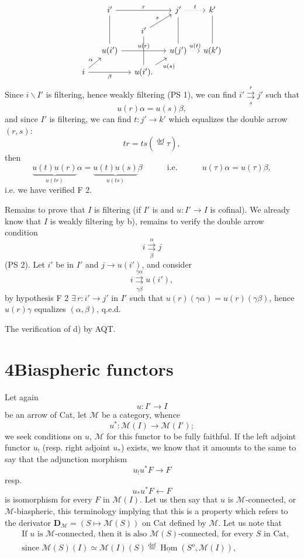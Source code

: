 \documentclass[11pt]{article}
\newcommand{\printedpage}[1]{\marginpar{\footnotesize p.~#1}}
\newcommand{\msp}[1]{\marginpar{\footnotesize [#1]}}
\newcommand{\uHom}{\underline{\operatorname{Hom}}}
\newcommand{\bs}{\backslash}
\newcommand{\cM}{\mathcal{M}}
\newcommand{\dbl}[2]{\mathrel{\overset{#1}{\underset{#2}{\rightrightarrows}}}}
\newcommand{\defeq}{\overset{\text{def}}{=}}
\begin{document}
\printedpage{31}
\msp{page 48}
\[
\begin{tikzcd}[row sep=small, column sep=small]
& i' \arrow[rr, "r"] \arrow[dd, dash] & & j' \arrow[r, dotted, "t"] \arrow[dd, dash] & k' \arrow[dd, dash] \\
& & i' \arrow[ur, "s"] \arrow[dd, dash] & & \\
& u(i') \arrow[rr, "u(r)"] & & u(j') \arrow[r, dotted, "u(t)"] & u(k') \\
i \arrow[ur, "\alpha"] \arrow[rr, "\beta"'] & & u(i'). \arrow[ur, "u(s)"'] & &
\end{tikzcd}
\]
Since $i\bs I'$ is filtering, hence weakly filtering (PS 1), we can find $i' \dbl{r}{s} j'$ such that
\[
u(r)\alpha = u(s)\beta,
\]
and since $I'$ is filtering, we can find $t : j' \longrightarrow k'$ which equalizes the double arrow $(r, s)$:
\[
tr = ts(\defeq \tau),
\]
then
\[
\underbrace{u(t)u(r)}_{u(tr)}\alpha = \underbrace{u(t)u(s)}_{u(ts)}\beta \qquad\quad \text{i.e.} \qquad\quad u(\tau)\alpha = u(\tau)\beta,
\]
i.e. we have verified F 2.

Remains to prove that $I$ is filtering (if $I'$ is and $u : I' \longrightarrow I$ is cofinal). We already know that $I$ is weakly filtering by b), remains to verify the double arrow condition
\[
i \dbl{\alpha}{\beta} j
\]
(PS 2). Let $i'$ be in $I'$ and $j \longrightarrow u(i')$, and consider
\[
i \dbl{\gamma\alpha}{\gamma\beta} u(i'),
\]
by hypothesis F 2 $\exists\, r : i' \longrightarrow j'$ in $I'$ such that
\msp{page 49}
$u(r)(\gamma\alpha) = u(r)(\gamma\beta)$, hence $u(r)\gamma$ equalizes $(\alpha, \beta)$, q.e.d.

The verification of d) by AQT.

\printedpage{32}
\section*{4\quad Biaspheric functors}

Let again
\[
u : I' \longrightarrow I
\]
be an arrow of Cat, let $\cM$ be a category, whence
\[
u^* : \cM(I) \longrightarrow \cM(I');
\tag*{(4.1)}
\]
we seek conditions on $u$, $\cM$ for this functor to be fully faithful. If the left adjoint functor $u_!$ (resp. right adjoint $u_*$) exists, we know that it amounts to the same to say that the adjunction morphism
\[
u_!u^*F \longrightarrow F
\tag*{(4.2)}
\]
resp.
\[
u_*u^*F \longleftarrow F
\tag*{(4.2 bis)}
\]
is isomorphism for every $F$ in $\cM(I)$. Let us then say that $u$ is $\cM$-connected, or $\cM$-biaspheric, this terminology implying that this is a property which refers to the derivator $\mathbf{D}_{\cM} = (S \longmapsto \cM(S))$ on Cat defined by $\cM$. Let us note that
\[
\begin{aligned}
&\text{If $u$ is $\cM$-connected, then it is also $\cM(S)$-connected, for every $S$ in Cat,}\\
&\text{since $\cM(S)(I) \simeq \cM(I)(S) \defeq \uHom(S^o, \cM(I))$,}
\end{aligned}
\tag*{(4.3)}
\]
\end{document}
